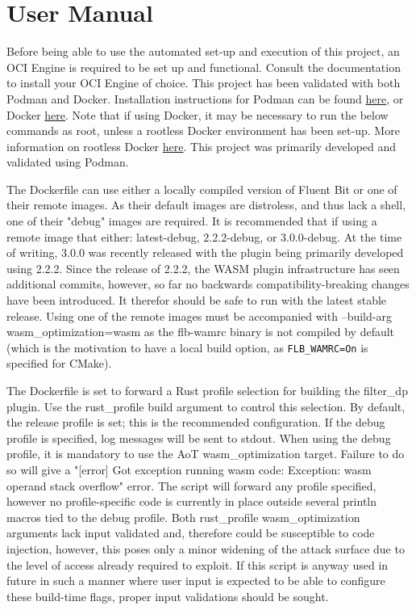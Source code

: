 \chapter{User Manual\label{chap:user_man}}

Before being able to use the automated set-up and execution of this project, an OCI Engine is required to be set up and functional. Consult the documentation to install your OCI Engine of choice. This project has been validated with both Podman and Docker. Installation instructions for Podman can be found \href{https://podman.io/docs/installation}{here},  or Docker \href{https://docs.docker.com/get-docker/}{here}. Note that if using Docker, it may be necessary to run the below commands as root, unless a rootless Docker environment has been set-up. More information on rootless Docker \href{https://docs.docker.com/engine/security/rootless/}{here}. This project was primarily developed and validated using Podman.

The Dockerfile can use either a locally compiled version of Fluent Bit or one of their remote images. As their default images are distroless, and thus lack a shell, one of their "debug" images are required. It is recommended that if using a remote image that either: latest-debug, 2.2.2-debug, or 3.0.0-debug. At the time of writing, 3.0.0 was recently released with the plugin being primarily developed using 2.2.2. Since the release of 2.2.2, the WASM plugin infrastructure has seen additional commits, however, so far no backwards compatibility-breaking changes have been introduced. It therefor should be safe to run with the latest stable release. Using one of the remote images must be accompanied with --build-arg wasm\_optimization=wasm as the flb-wamrc binary is not compiled by default (which is the motivation to have a local build option, as \texttt{FLB\_WAMRC=On} is specified for CMake). 

The Dockerfile is set to forward a Rust profile selection for building the filter\_dp plugin. Use the rust\_profile build argument to control this selection. By default, the release profile is set; this is the recommended configuration. If the debug profile is specified, log messages will be sent to stdout. When using the debug profile, it is mandatory to use the AoT wasm\_optimization target. Failure to do so will give a "[error] Got exception running wasm code: Exception: wasm operand stack overflow" error. The script will forward any profile specified, however no profile-specific code is currently in place outside several println macros tied to the debug profile. Both rust\_profile wasm\_optimization arguments lack input validated and, therefore could be susceptible to code injection, however, this poses only a minor widening of the attack surface due to the level of access already required to exploit. If this script is anyway used in future in such a manner where user input is expected to be able to configure these build-time flags, proper input validations should be sought. 

